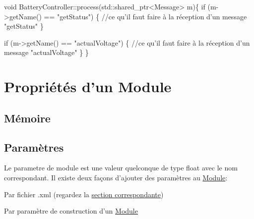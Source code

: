 \begin{DoxyCode}
\textcolor{keywordtype}{void} BatteryController::process(std::shared\_ptr<Message> m)\{
    \textcolor{keywordflow}{if} (m->getName() == \textcolor{stringliteral}{"getStatus"}) \{
        \textcolor{comment}{//ce qu'il faut faire à la réception d'un message "getStatus"}
    \}

    \textcolor{keywordflow}{if} (m->getName() == \textcolor{stringliteral}{"actualVoltage"}) \{
        \textcolor{comment}{//ce qu'il faut faire à la réception d'un message "actualVoltage"}
    \}
\}
\end{DoxyCode}
\hypertarget{docModule_properties}{}\section{Propriétés d'un Module}\label{docModule_properties}
\hypertarget{docModule_memory}{}\subsection{Mémoire}\label{docModule_memory}
\hypertarget{docModule_parameters}{}\subsection{Paramètres}\label{docModule_parameters}
Le parametre de module est une valeur quelconque de type float avec le nom correspondant. Il existe deux façons d'ajouter des paramètres au \hyperlink{classModule}{Module}\-:
\begin{DoxyItemize}
\item Par fichier .xml (regardez la \hyperlink{xmlRef}{section correspondante})
\item Par paramètre de construction d'un \hyperlink{classModule}{Module}
\end{DoxyItemize}


